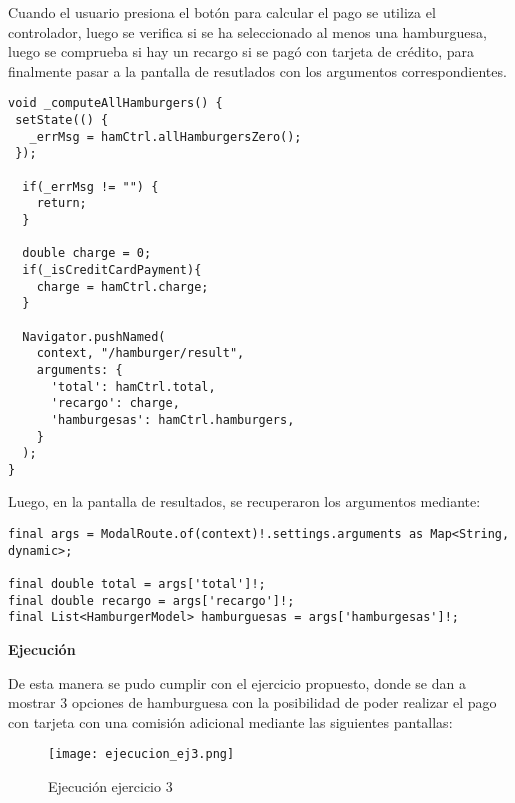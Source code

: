 Cuando el usuario presiona el botón para calcular el pago se utiliza el controlador, luego se verifica si se ha seleccionado al menos una hamburguesa, luego se comprueba si hay un recargo si se pagó con tarjeta de crédito, para finalmente pasar a la pantalla de resutlados con los argumentos correspondientes.

\begin{center}
\begin{lstlisting}
void _computeAllHamburgers() {
 setState(() {
   _errMsg = hamCtrl.allHamburgersZero();
 });

  if(_errMsg != "") {
    return;
  }

  double charge = 0;
  if(_isCreditCardPayment){
    charge = hamCtrl.charge;
  }

  Navigator.pushNamed(
    context, "/hamburger/result",
    arguments: {
      'total': hamCtrl.total,
      'recargo': charge,
      'hamburgesas': hamCtrl.hamburgers,
    }
  );
}
\end{lstlisting}
\end{center}

Luego, en la pantalla de resultados, se recuperaron los argumentos mediante:

\begin{center}
\begin{lstlisting}
final args = ModalRoute.of(context)!.settings.arguments as Map<String, dynamic>;

final double total = args['total']!;
final double recargo = args['recargo']!;
final List<HamburgerModel> hamburguesas = args['hamburgesas']!;
\end{lstlisting}
\end{center}

\textbf{Ejecución}

De esta manera se pudo cumplir con el ejercicio propuesto, donde se dan a mostrar 3 opciones de hamburguesa con la posibilidad de poder realizar el pago con tarjeta con una comisión adicional mediante las siguientes pantallas:

\begin{figure}[H]
    \centering
    \texttt{[image: ejecucion\_ej3.png]}
    \caption{Ejecución ejercicio 3}
    \label{fig:ej3_ejecuccion}
\end{figure}